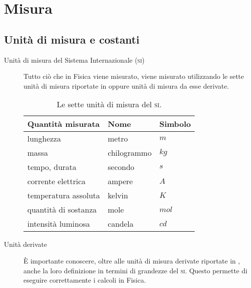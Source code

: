 \documentclass[a4paper,11pt,italian]{article}
\begin{document}
\newpage
\section{Misura}

\subsection{Unità di misura e costanti}

\begin{description}
  \item[Unità di misura del Sistema Internazionale (\textsc{si})]
  Tutto ciò che in Fisica viene misurato, viene misurato utilizzando le sette unità di misura riportate in  oppure unità di misura da esse derivate.
  \begin{table}[htp]\centering
  \begin{tabular}{lll}\toprule
    \textbf{Quantità misurata} & \textbf{Nome} & \textbf{Simbolo} \\\midrule
    lunghezza & metro & $ m $ \\
    massa & chilogrammo & $ kg $ \\
    tempo, durata & secondo & $ s $ \\
    corrente elettrica  & ampere & $ A $ \\
    temperatura assoluta & kelvin & $ K $ \\
    quantità di sostanza & mole & $ mol $ \\
    intensità luminosa & candela & $ cd $ \\\bottomrule
  \end{tabular}
  \caption{Le sette unità di misura del \textsc{si}.}
  \label{tab:udmSI}
  \end{table}
 
 \item[Unità derivate]
 È importante conoscere, oltre alle unità di misura derivate riportate in , anche la loro definizione in termini di grandezze del \textsc{si}. Questo permette di eseguire correttamente i calcoli in Fisica.
 

\end{description}
\end{document}
